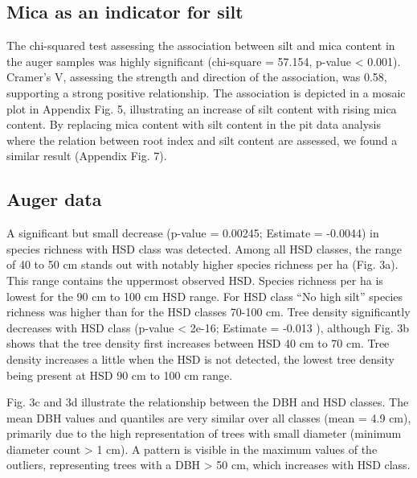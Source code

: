 \documentclass[fleqn,11pt]{latex/stylish_article} %
\begin{document}
\normalsize

\hypertarget{mica-as-an-indicator-for-silt}{%
\subsection{Mica as an indicator for silt}\label{mica-as-an-indicator-for-silt}}

The chi-squared test assessing the association between silt and mica content in the auger samples was highly significant (chi-square = 57.154, p-value \textless{} 0.001). Cramer's V, assessing the strength and direction of the association, was 0.58, supporting a strong positive relationship. The association is depicted in a mosaic plot in Appendix Fig. 5, illustrating an increase of silt content with rising mica content. By replacing mica content with silt content in the pit data analysis where the relation between root index and silt content are assessed, we found a similar result (Appendix Fig. 7).

\hypertarget{auger-data}{%
\subsection{Auger data}\label{auger-data}}

A significant but small decrease (p-value = 0.00245; Estimate = -0.0044) in species richness with HSD class was detected. Among all HSD classes, the range of 40 to 50 cm stands out with notably higher species richness per ha (Fig. 3a). This range contains the uppermost observed HSD. Species richness per ha is lowest for the 90 cm to 100 cm HSD range. For HSD class \enquote{No high silt} species richness was higher than for the HSD classes 70-100 cm. Tree density significantly decreases with HSD class (p-value \textless{} 2e-16; Estimate = -0.013 ), although Fig. 3b shows that the tree density first increases between HSD 40 cm to 70 cm. Tree density increases a little when the HSD is not detected, the lowest tree density being present at HSD 90 cm to 100 cm range.

Fig. 3c and 3d illustrate the relationship between the DBH and HSD classes. The mean DBH values and quantiles are very similar over all classes (mean = 4.9 cm), primarily due to the high representation of trees with small diameter (minimum diameter count \textgreater{} 1 cm). A pattern is visible in the maximum values of the outliers, representing trees with a DBH \textgreater{} 50 cm, which increases with HSD class.
\end{document}
